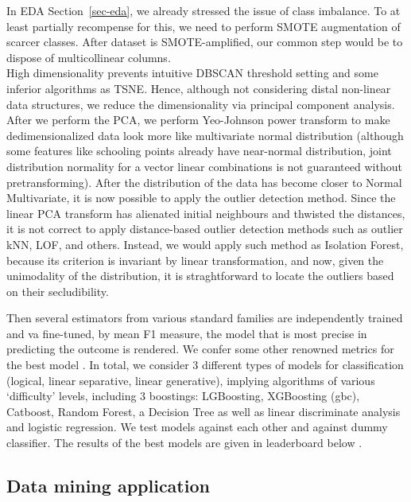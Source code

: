 \documentclass[
  letterpaper,
  DIV=11,
  numbers=noendperiod]{scrartcl}
\begin{document}
In EDA Section~\ref{sec-eda}, we already stressed the issue of class
imbalance. To at least partially recompense for this, we need to perform
SMOTE augmentation of scarcer classes. After dataset is SMOTE-amplified,
our common step would be to dispose of multicollinear columns.\\
High dimensionality prevents intuitive DBSCAN threshold setting and some
inferior algorithms as TSNE. Hence, although not considering distal
non-linear data structures, we reduce the dimensionality via principal
component analysis. After we perform the PCA, we perform Yeo-Johnson
power transform to make dedimensionalized data look more like
multivariate normal distribution (although some features like schooling
points already have near-normal distribution, joint distribution
normality for a vector linear combinations is not guaranteed without
pretransforming). After the distribution of the data has become closer
to Normal Multivariate, it is now possible to apply the outlier
detection method. Since the linear PCA transform has alienated initial
neighbours and thwisted the distances, it is not correct to apply
distance-based outlier detection methods such as outlier kNN, LOF, and
others. Instead, we would apply such method as Isolation Forest, because
its criterion is invariant by linear transformation, and now, given the
unimodality of the distribution, it is straghtforward to locate the
outliers based on their secludibility.

Then several estimators from various standard families are independently
trained and va fine-tuned, by mean F1 measure, the model that is most
precise in predicting the outcome is rendered. We confer some other
renowned metrics for the best model . In total, we consider 3 different
types of models for classification (logical, linear separative, linear
generative), implying algorithms of various \enquote*{difficulty}
levels, including 3 boostings: LGBoosting, XGBoosting (gbc), Catboost,
Random Forest, a Decision Tree as well as linear discriminate analysis
and logistic regression. We test models against each other and against
dummy classifier. The results of the best models are given in
leaderboard below .

\hypertarget{data-mining-application}{%
\subsection{Data mining application}\label{data-mining-application}}
\end{document}
